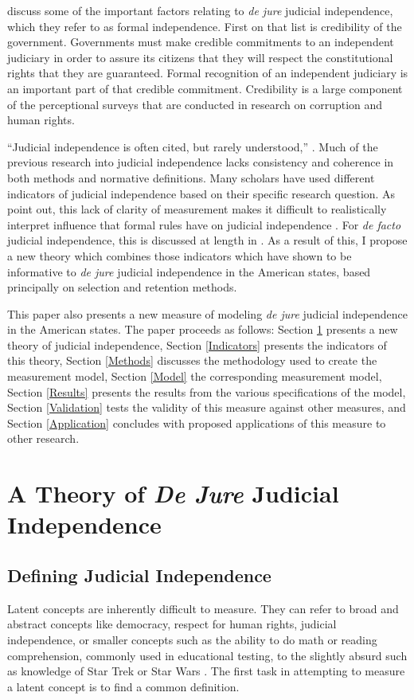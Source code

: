 \documentclass[12pt]{article}
\begin{document}
\citet{Hayo2007} discuss some of the important factors relating to \textit{de jure} judicial independence, which they refer to as formal independence.  First on that list is credibility of the government.  Governments must make credible commitments to an independent judiciary in order to assure its citizens that they will respect the constitutional rights that they are guaranteed.  Formal recognition of an independent judiciary is an important part of that credible commitment.   Credibility is a large component of the perceptional surveys that are conducted in research on corruption and human rights.

``Judicial independence is often cited, but rarely understood,'' \citep[1]{Tiede2006}.  Much of the previous research into judicial independence lacks consistency and coherence in both methods and normative definitions.  Many scholars have used different indicators of judicial independence based on their specific research question.  As \citeauthor{Rios2014} point out, this lack of clarity of measurement makes it difficult to realistically interpret influence that formal rules have on judicial independence \citep[2]{Rios2014}.  For \textit{de facto} judicial independence, this is discussed at length in \cite{Rios2014}.  As a result of this, I propose a new theory which combines those indicators which have shown to be informative to \textit{de jure} judicial independence in the American states, based principally on selection and retention methods.

This paper also presents a new measure of modeling \textit{de jure} judicial independence in the American states.  The paper proceeds as follows: Section \ref{Theory} presents a new theory of judicial independence, Section \ref{Indicators} presents the indicators of this theory, Section \ref{Methods} discusses the methodology used to create the measurement model, Section \ref{Model} the corresponding measurement model, Section \ref{Results} presents the results from the various specifications of the model, Section \ref{Validation} tests the validity of this measure against other measures, and Section \ref{Application} concludes with proposed applications of this measure to other research.	

\section{A Theory of \textit{De Jure} Judicial Independence}\label{Theory}
\subsection*{Defining Judicial Independence}%
Latent concepts are inherently difficult to measure.  They can refer to broad and abstract concepts like democracy, respect for human rights, judicial independence, or smaller concepts such as the ability to do math or reading comprehension, commonly used in educational testing, to the slightly absurd such as knowledge of Star Trek or Star Wars \citep{Jackman2008, Treier2008,Schnakenberg2014,Linzer2014}.  The first task in attempting to measure a latent concept is to find a common definition.  
\end{document}
